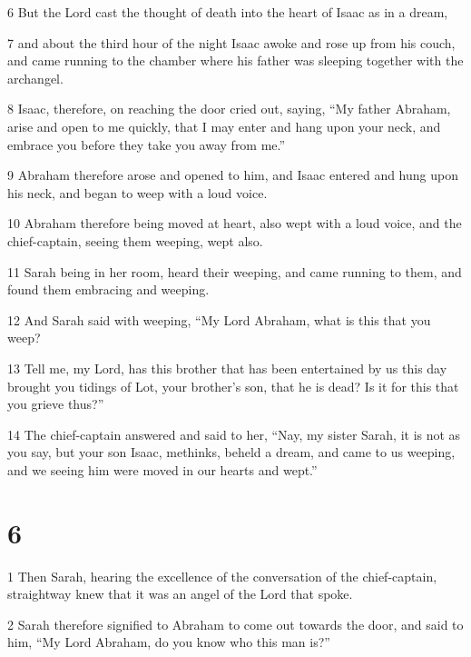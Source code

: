 \par 6 But the Lord cast the thought of death into the heart of Isaac as in a dream, 

\par 7 and about the third hour of the night Isaac awoke and rose up from his couch, and came running to the chamber where his father was sleeping together with the archangel. 

\par 8 Isaac, therefore, on reaching the door cried out, saying, “My father Abraham, arise and open to me quickly, that I may enter and hang upon your neck, and embrace you before they take you away from me.” 

\par 9 Abraham therefore arose and opened to him, and Isaac entered and hung upon his neck, and began to weep with a loud voice. 

\par 10 Abraham therefore being moved at heart, also wept with a loud voice, and the chief-captain, seeing them weeping, wept also. 

\par 11 Sarah being in her room, heard their weeping, and came running to them, and found them embracing and weeping. 

\par 12 And Sarah said with weeping, “My Lord Abraham, what is this that you weep? 

\par 13 Tell me, my Lord, has this brother that has been entertained by us this day brought you tidings of Lot, your brother's son, that he is dead? Is it for this that you grieve thus?” 

\par 14 The chief-captain answered and said to her, “Nay, my sister Sarah, it is not as you say, but your son Isaac, methinks, beheld a dream, and came to us weeping, and we seeing him were moved in our hearts and wept.”

\chapter{6}

\par 1 Then Sarah, hearing the excellence of the conversation of the chief-captain, straightway knew that it was an angel of the Lord that spoke. 

\par 2 Sarah therefore signified to Abraham to come out towards the door, and said to him, “My Lord Abraham, do you know who this man is?” 

